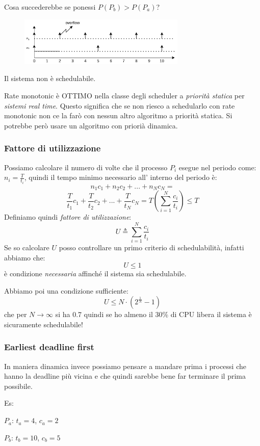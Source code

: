 Cosa succederebbe se ponessi $P(P_b) > P(P_a)$?
\begin{figure}[H]
    \centering
    \includegraphics[width=300px]{images/4_Scheduling/rate_monotonic_inverso.png}
\end{figure}
Il sistema non è schedulabile.

Rate monotonic è OTTIMO nella classe degli scheduler a \emph{priorità statica} per \emph{sistemi real time}.
Questo significa che se non riesco a schedularlo con rate monotonic non ce la farò con nessun altro algoritmo a priorità statica. Si potrebbe però usare un algoritmo con priorià dinamica.

\subsubsection{Fattore di utilizzazione}
Possiamo calcolare il numero di volte che il processo $P_i$ esegue nel periodo come: $n_i = \frac{T}{t_i}$, quindi il tempo minimo necessario all' interno del periodo è:
$$ n_1c_1 + n_2c_2 + ... + n_Nc_N = $$
$$ \frac{T}{t_1}c_1 + \frac{T}{t_2}c_2 + ... + \frac{T}{t_N}c_N = T( \sum_{i=1}^{N} \frac{c_i}{t_i} ) \leq T $$
Definiamo quindi \emph{fattore di utilizzazione}: 
$$U \triangleq \sum_{i=1}^{N} \frac{c_i}{t_i} $$
Se so calcolare $U$ posso controllare un primo criterio di schedulabilità, infatti abbiamo che:
$$ U \leq 1 $$
è condizione \emph{necessaria} affinché il sistema sia schedulabile.

Abbiamo poi una condizione sufficiente:
$$ U \leq N \cdot (2^{\frac{1}{N}} - 1) $$
che per $N \xrightarrow{} \infty$ si ha 0.7 quindi se ho almeno il 30\% di CPU libera il sistema è sicuramente schedulabile!

\subsubsection{Earliest deadline first}
In maniera dinamica invece possiamo pensare a mandare prima i processi che hanno la deadline più vicina e che quindi sarebbe bene far terminare il prima possibile.

Es:

$P_a$: $t_a = 4$, $c_a = 2$

$P_b$: $t_b = 10$, $c_b = 5$

